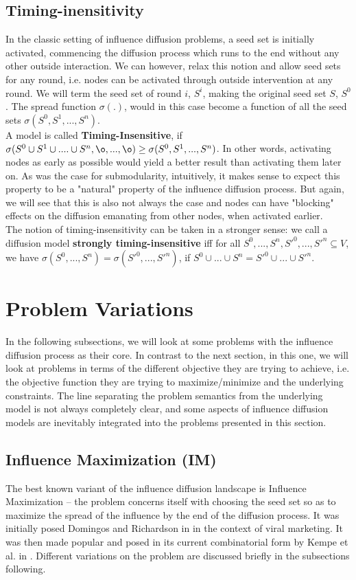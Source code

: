 \documentclass[twocolumn, 10pt]{article}
\begin{document}
\subsection{Timing-inensitivity}
In the classic setting of influence diffusion problems, a seed set is initially activated, commencing the diffusion process which runs to the end without any other outside interaction. We can however, relax this notion and allow seed sets for any round, i.e. nodes can be activated through outside intervention at any round. We will term the seed set of round $i$, $S^i$, making the original seed set $S$, $S^0$. The spread function $\sigma(.)$, would in this case become a function of all the seed sets $\sigma(S^0, S^1, ..., S^n)$. \\
A model is called \textbf{Timing-Insensitive}, if $\sigma(S^0 \cup S^1 \cup .... \cup S^n, \o, ..., \o) \geq \sigma(S^0, S^1, ..., S^n)$. In other words, activating nodes as early as possible would yield a better result than activating them later on. As was the case for submodularity, intuitively, it makes sense to expect this property to be a "natural" property of the influence diffusion process. But again, we will see that this is also not always the case and nodes can have "blocking" effects on the diffusion emanating from other nodes, when activated earlier. \\
The notion of timing-insensitivity can be taken in a stronger sense: we call a diffusion model \textbf{strongly timing-insensitive} iff for all $S^0, ..., S^n, S'^0, ..., S'^n \subseteq V$, we have $\sigma(S^0,..., S^n) = \sigma(S'^0,..., S'^n)$, if $S^0 \cup ... \cup S^n = S'^0 \cup ... \cup S'^n$.
\section{Problem Variations}
In the following subsections, we will look at some problems with the influence diffusion process as their core. In contrast to the next section, in this one, we will look at problems in terms of the different objective they are trying to achieve, i.e. the objective function they are trying to maximize/minimize and the underlying constraints. The line separating the problem semantics from the underlying model is not always completely clear, and some aspects of influence diffusion models are inevitably integrated into the problems presented in this section. \\
\subsection{Influence Maximization (IM)}
The best known variant of the influence diffusion landscape is Influence Maximization -- the problem concerns itself with choosing the seed set so as to maximize the spread of the influence by the end of the diffusion process. It was initially posed Domingos and Richardson in \cite{dom} in the context of viral marketing. It was then made popular and posed in its current combinatorial form by Kempe et al. in \cite{kempe}. Different variations on the problem are discussed briefly in the subsections following.
\end{document}
